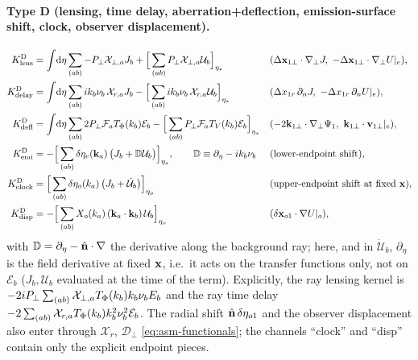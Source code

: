 \paragraph{Type D (lensing, time delay, aberration+deflection, emission-surface shift, clock, observer displacement).}
\begin{align}
K^{\rm D}_{\rm lens}&=\int\!\dd\eta\sum_{(ab)}-P_\perp\mathcal X_{\perp,a}J_b+\Big[\sum_{(ab)}P_\perp\mathcal X_{\perp,a}\mathcal U_b\Big]_{\eta_*}
&&(\Delta\vx_{1\perp}\cdot\nabla_\perp J,\ -\Delta\vx_{1\perp}\cdot\nabla_\perp U|_e),\nonumber\\
K^{\rm D}_{\rm delay}&=\int\!\dd\eta\sum_{(ab)}ik_b\nu_b\,\mathcal X_{r,a}J_b-\Big[\sum_{(ab)}ik_b\nu_b\,\mathcal X_{r,a}\mathcal U_b\Big]_{\eta_*}
&&(\Delta x_{1r}\,\partial_nJ,\ -\Delta x_{1r}\,\partial_nU|_e),\nonumber\\
K^{\rm D}_{\rm defl}&=\int\!\dd\eta\sum_{(ab)}2P_\perp\mathcal F_a\TP(k_b)\mathcal E_b-\Big[\sum_{(ab)}P_\perp\mathcal F_aT_V(k_b)\mathcal E_b\Big]_{\eta_*}
&&(-2\vk_{1\perp}\cdot\nabla_\perp\Psi_1,\ \vk_{1\perp}\cdot\vv_{1\perp}|_e),\nonumber\\
K^{\rm D}_{\rm emi}&=-\Big[\sum_{(ab)}\delta\eta_e(\vk_a)\,\big(J_b+\mathbb D \mathcal U_b\big)\Big]_{\eta_*},\qquad \mathbb D\equiv\partial_\eta-ik_b\nu_b
&&(\text{lower-endpoint shift}),\nonumber\\
K^{\rm D}_{\rm clock}&=\Big[\sum_{(ab)}\delta\eta_o(k_a)\,\big(J_b+\dot{\mathcal U}_b\big)\Big]_{\eta_o}
&&(\text{upper-endpoint shift at fixed }\vx),\nonumber\\
K^{\rm D}_{\rm disp}&=-\Big[\sum_{(ab)}X_o(k_a)\,(\vk_a\cdot\vk_b)\,\mathcal U_b\Big]_{\eta_o}
&&(\delta\vx_{o1}\cdot\nabla U|_o),
\label{eq:asm-chD}
\end{align}
with $\mathbb D=\partial_\eta-\hat{\mathbf n}\cdot\nabla$ the derivative along the background ray; here, and in $\dot{\mathcal U}_b$, $\partial_\eta$ is the
field derivative at fixed $\mathbf x$, i.e.\ it acts on the transfer functions only, not on $\mathcal E_b$ ($J_b,\mathcal U_b$ evaluated at the time of the term).  Explicitly, the ray lensing kernel is $-2iP_\perp\sum_{(ab)}\mathcal X_{\perp,a}T_\Phi(k_b)k_b\nu_bE_b$ and the ray time
delay $-2\sum_{(ab)}\mathcal X_{r,a}T_\Phi(k_b)k_b^2\nu_b^2\mathcal E_b$.  The radial shift $\hat{\mathbf n}\,\delta\eta_{o1}$ and the observer displacement also
enter through $\mathcal X_{r}$, $\mathcal D_\perp$ \eqref{eq:asm-functionals}; the channels ``clock'' and ``disp'' contain only the
explicit endpoint pieces.

